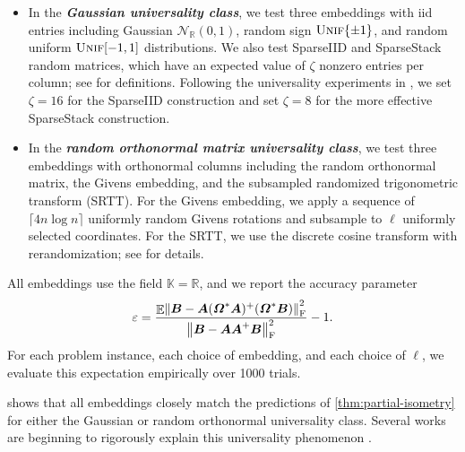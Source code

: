 \documentclass[11pt]{article}
\newcommand{\real}{\mathbb{R}}
\newcommand{\field}{\mathbb{K}}
\newcommand{\mat}[1]{\boldsymbol{#1}}
\newcommand{\norm}[1]{\mleft\| #1 \mright\|}
\DeclareMathOperator{\expect}{\mathbb{E}}
\DeclareMathOperator{\Unif}{\textsc{Unif}}
\theoremstyle{definition}
\numberwithin{equation}{section}
\begin{document}
\begin{itemize}
    \item In the \textbf{\textit{Gaussian universality class}}, we test three embeddings with iid entries including Gaussian $\mathcal{N}_\real(0,1)$, random sign $\Unif\{\pm 1\}$, and random uniform $\Unif [-1,1]$ distributions.
    We also test SparseIID and SparseStack random matrices, which have an expected value of $\zeta$ nonzero entries per column; see \cite{CEMT25} for definitions.
    Following the universality experiments in \cite[App.~B]{Epp25a}, we set $\zeta = 16$ for the SparseIID construction and set $\zeta = 8$ for the more effective SparseStack construction.
    \item In the \textbf{\textit{random orthonormal matrix universality class}}, we test three embeddings with orthonormal columns including the random orthonormal matrix, the Givens embedding, and the subsampled randomized trigonometric transform (SRTT).
    For the Givens embedding, we apply a sequence of $\lceil 4n\log n\rceil$ uniformly random Givens rotations and subsample to $\ell$ uniformly selected coordinates.
    For the SRTT, we use the discrete cosine transform with rerandomization; see \cite[Def.~B.14]{Epp25a} for details.    
\end{itemize}
%
All embeddings use the field $\field = \real$, and we report the accuracy parameter 
\begin{equation*}
    \varepsilon = \frac{\expect \norm{\mat{B} - \mat{A}(\mat{\varOmega}^*\mat{A})^+ (\mat{\varOmega}^*\mat{B})}_{\rm F}^2}{\norm{\mat{B} - \mat{A} \mat{A}^+ \mat{B}}_{\rm F}^2} - 1.
\end{equation*}
For each problem instance, each choice of embedding, and each choice of $\ell$, we evaluate this expectation empirically over 1000 trials.

 shows that all embeddings closely match the predictions of  \cref{thm:partial-isometry} for either the Gaussian or random orthonormal universality class.
Several works are beginning to rigorously explain this universality phenomenon \cite{DL19a,Der23,CDDR24}.
\end{document}
